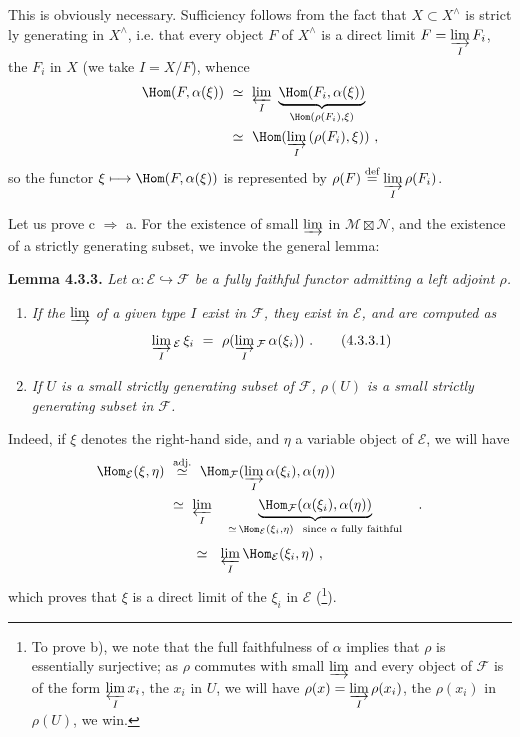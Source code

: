 \noindent This is obviously necessary. Sufficiency follows from the fact that $X\subset X^\wedge$ is strict%
%
%
ly generating in $X^\wedge$, i.e. that every object $F$ of $X^\wedge$ is a direct limit $F=\varinjlim\limits_I F_i$, the $F_i$ in $X$ (we take $I=X/F$), whence
\[
\begin{aligned}
\Hom(F,\alpha(\xi))\ &\simeq\ \varprojlim_I\ \underbrace{\Hom(F_i,\alpha(\xi))}_{\Hom(\rho(F_i),\xi)}\\
&\simeq\ \Hom(\varinjlim_I\,(\rho(F_i),\xi))\ ,
\end{aligned}
\]
so the functor $\xi\longmapsto\Hom(F,\alpha(\xi))$ is represented by $\rho(F)\overset{\text{def}}{=}\varinjlim\limits_I\rho(F_i)$.

\noindent Let us prove c $\Longrightarrow$ a. For the existence of small $\varinjlim$ in $\mathcal M\boxtimes\mathcal N$, and the existence of a strictly generating subset, we invoke the general lemma:

\noindent\textbf{Lemma 4.3.3.} \textit{Let $\alpha:\mathcal E\hookrightarrow\mathcal F$ be a fully faithful functor admitting a left adjoint $\rho$.}
\begin{enumerate}[label={}]
\item[\textcircled{a}] \textit{If the $\varinjlim$ of a given type $I$ exist in $\mathcal F$, they exist in $\mathcal E$, and are computed as}
\[
\varinjlim_I{}_{\mathcal E}\,\xi_i\ =\ \rho(\varinjlim_I{}_{\mathcal F}\,\alpha(\xi_i))\ .
\tag*{(4.3.3.1)}
\]
\item[\textcircled{b}] \textit{If $U$ is a small strictly generating subset of $\mathcal F$, $\rho(U)$ is a small strictly generating subset in $\mathcal F$.}
\end{enumerate}

\noindent Indeed, if $\xi$ denotes the right-hand side, and $\eta$ a variable object of $\mathcal E$, we will have
\[
\begin{aligned}
\Hom_{\mathcal E}(\xi,\eta)\ &\overset{\text{adj.}}{\simeq}\ \Hom_{\mathcal F}(\varinjlim_I\alpha(\xi_i),\alpha(\eta))\\
&\simeq\ \varprojlim_I\quad\underbrace{\Hom_{\mathcal F}(\alpha(\xi_i),\alpha(\eta))}_{\simeq\,\Hom_{\mathcal E}(\xi_i,\eta)\ \ \text{since $\alpha$ fully faithful}}\quad .
\end{aligned}
\]
\[
\simeq\ \ \varprojlim_I\Hom_{\mathcal E}(\xi_i,\eta)\ ,
\]
which proves that $\xi$ is a direct limit of the $\xi_i$ in $\mathcal E$ (\footnote{To prove b), we note that the full faithfulness of $\alpha$ implies that $\rho$ is essentially surjective; as $\rho$ commutes with small $\varinjlim$ and every object of $\mathcal F$ is of the form $\varprojlim\limits_I x_i$, the $x_i$ in $U$, we will have $\rho(x)=\varinjlim\limits_I\rho(x_i)$, the $\rho(x_i)$ in $\rho(U)$, we win.}).

